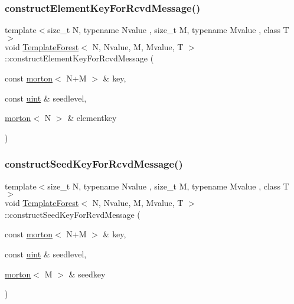 \subsubsection{\texorpdfstring{construct\+Element\+Key\+For\+Rcvd\+Message()}{constructElementKeyForRcvdMessage()}}
{\footnotesize\ttfamily template$<$size\+\_\+t N, typename Nvalue , size\+\_\+t M, typename Mvalue , class T $>$ \\
void \mbox{\hyperlink{classTemplateForest}{Template\+Forest}}$<$ N, Nvalue, M, Mvalue, T $>$\+::construct\+Element\+Key\+For\+Rcvd\+Message (\begin{DoxyParamCaption}\item[{const \mbox{\hyperlink{definitions_8h_af8682350bd8bb38ee9023f7a0a310add}{morton}}$<$ N+M $>$ \&}]{key,  }\item[{const \mbox{\hyperlink{definitions_8h_a69aa29b598b851b0640aa225a9e5d61d}{uint}} \&}]{seedlevel,  }\item[{\mbox{\hyperlink{definitions_8h_af8682350bd8bb38ee9023f7a0a310add}{morton}}$<$ N $>$ \&}]{elementkey }\end{DoxyParamCaption})}

\mbox{\label{classTemplateForest_a6418c12f88e909d8fb69736e320f92b7}} 
\subsubsection{\texorpdfstring{construct\+Seed\+Key\+For\+Rcvd\+Message()}{constructSeedKeyForRcvdMessage()}}
{\footnotesize\ttfamily template$<$size\+\_\+t N, typename Nvalue , size\+\_\+t M, typename Mvalue , class T $>$ \\
void \mbox{\hyperlink{classTemplateForest}{Template\+Forest}}$<$ N, Nvalue, M, Mvalue, T $>$\+::construct\+Seed\+Key\+For\+Rcvd\+Message (\begin{DoxyParamCaption}\item[{const \mbox{\hyperlink{definitions_8h_af8682350bd8bb38ee9023f7a0a310add}{morton}}$<$ N+M $>$ \&}]{key,  }\item[{const \mbox{\hyperlink{definitions_8h_a69aa29b598b851b0640aa225a9e5d61d}{uint}} \&}]{seedlevel,  }\item[{\mbox{\hyperlink{definitions_8h_af8682350bd8bb38ee9023f7a0a310add}{morton}}$<$ M $>$ \&}]{seedkey }\end{DoxyParamCaption})}

